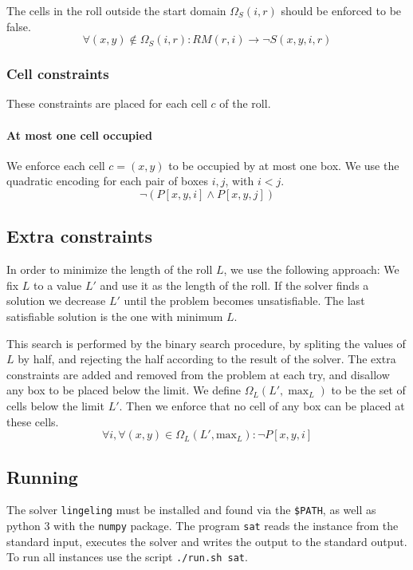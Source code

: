 \documentclass[a4paper]{article}
\begin{document}
The cells in the roll outside the start domain $\Omega_S(i,r)$ should be 
enforced to be false.
%
$$ \forall (x,y) \notin \Omega_S(i,r) : RM(r,i) \to \lnot S(x,y,i,r) $$





\subsubsection{Cell constraints}

These constraints are placed for each cell $c$ of the roll.

\paragraph{At most one cell occupied}

We enforce each cell $c=(x,y)$ to be occupied by at most one box. We use the 
quadratic encoding for each pair of boxes $i,j$, with $i < j$.
%
$$ \lnot (P[x,y,i] \land P[x,y,j]) $$

\subsection{Extra constraints}

In order to minimize the length of the roll $L$, we use the following approach: 
We fix $L$ to a value $L'$ and use it as the length of the roll. If the solver 
finds a solution we decrease $L'$ until the problem becomes unsatisfiable. The 
last satisfiable solution is the one with minimum $L$.

This search is performed by the binary search procedure, by spliting the values 
of $L$ by half, and rejecting the half according to the result of the solver.
%
The extra constraints are added and removed from the problem at each try, and 
disallow any box to be placed below the limit. We define $\Omega_L(L', \max_L)$ 
to be the set of cells below the limit $L'$. Then we enforce that no cell of any 
box can be placed at these cells.
%
$$\forall i, \forall (x,y) \in \Omega_L(L', \textrm{max}_L) : \lnot P[x,y,i]$$

\subsection{Running}

The solver \texttt{lingeling} must be installed and found via the 
\texttt{\$PATH}, as well as python 3 with the \texttt{numpy} package. The 
program \texttt{sat} reads the instance from the standard input, executes the 
solver and writes the output to the standard output. To run all instances use 
the script \texttt{./run.sh sat}.
\end{document}
